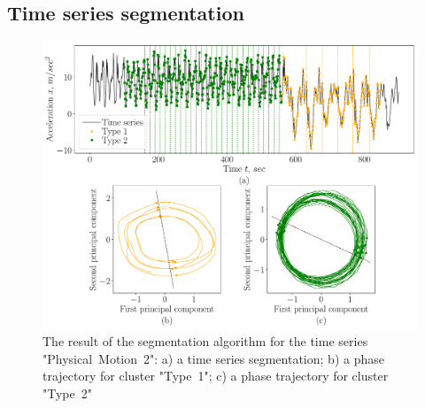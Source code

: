 \documentclass[12pt, twoside]{article}
\numberwithin{equation}{section}
\begin{document}



\subsection{Time series segmentation}
\begin{figure}[h!t]\center
\includegraphics[width=1\textwidth]{results_eng/experiment_segmentation}
\caption{The result of the segmentation algorithm for the time series "Physical~Motion~2": 
a) a time series segmentation; b) a phase trajectory for cluster "Type~1"; c) a phase trajectory for cluster "Type~2"}
\label{fig:experiment:2}
\end{figure}
\end{document}
